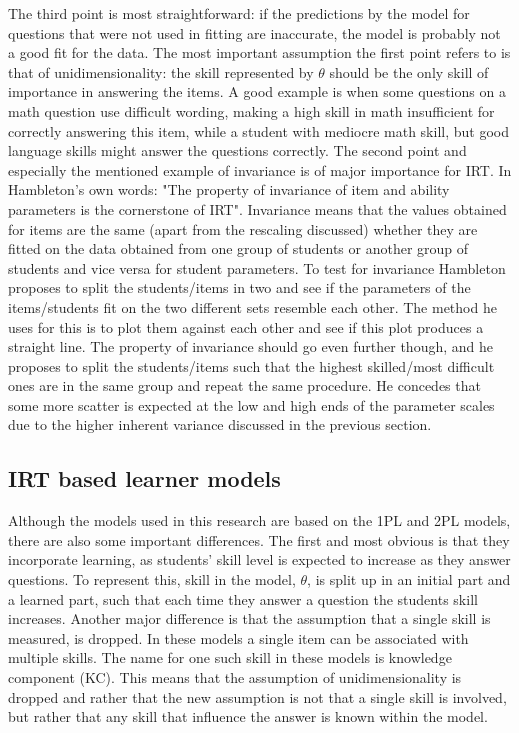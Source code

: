 \documentclass{scrartcl}
\begin{document}
The third point is most straightforward: if the predictions by the model for questions that were not used in fitting are inaccurate, the model is probably not a good fit for the data. The most important assumption the first point refers to is that of unidimensionality: the skill represented by $\theta$ should be the only skill of importance in answering the items. A good example is when some questions on a math question use difficult wording, making a high skill in math insufficient for correctly answering this item, while a student with mediocre math skill, but good language skills might answer the questions correctly. The second point and especially the mentioned example of invariance is of major importance for IRT. In Hambleton's own words: "The property of invariance of item and ability parameters is the cornerstone of IRT". Invariance means that the values obtained for items are the same (apart from the rescaling discussed) whether they are fitted on the data obtained from one group of students or another group of students and vice versa for student parameters. To test for invariance Hambleton proposes to split the students/items in two and see if the parameters of the items/students fit on the two different sets resemble each other. The method he uses for this is to plot them against each other and see if this plot produces a straight line. The property of invariance should go even further though, and he proposes to split the students/items such that the highest skilled/most difficult ones are in the same group and repeat the same procedure. He concedes that some more scatter is expected at the low and high ends of the parameter scales due to the higher inherent variance discussed in the previous section.




\subsection{IRT based learner models}
Although the models used in this research are based on the 1PL and 2PL models, there are also some important differences. The first and most obvious is that they incorporate learning, as students' skill level is expected to increase as they answer questions. To represent this, skill in the model, $\theta$, is split up in an initial part and a learned part, such that each time they answer a question the students skill increases. 
Another major difference is that the assumption that a single skill is measured, is dropped. In these models a single item can be associated with multiple skills. The name for one such skill in these models is knowledge component (KC). This means that the assumption of unidimensionality is dropped and rather that the new assumption is not that a single skill is involved, but rather that any skill that influence the answer is known within the model.
\end{document}

